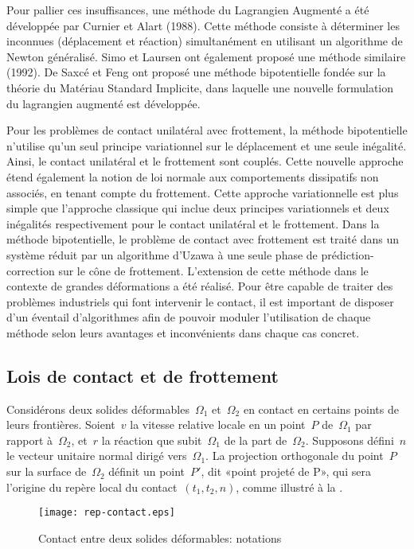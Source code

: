 \medskip
Pour pallier ces insuffisances, une méthode du Lagrangien Augmenté a été développée par Curnier et Alart (1988). Cette méthode consiste à déterminer les inconnues (déplacement et réaction) simultanément en utilisant un algorithme de Newton généralisé. Simo et Laursen ont également proposé une méthode similaire (1992). De Saxcé et Feng ont proposé une méthode bipotentielle fondée sur la théorie du Matériau Standard Implicite, dans laquelle une nouvelle formulation du lagrangien augmenté est développée.

Pour les problèmes de contact unilatéral avec frottement, la méthode bipotentielle n'utilise qu'un seul principe variationnel sur le déplacement et une seule inégalité. Ainsi, le contact unilatéral et le frottement sont couplés. Cette nouvelle approche étend également la notion de loi normale aux comportements dissipatifs non associés, en tenant compte du frottement. Cette approche variationnelle est plus simple que l'approche classique qui inclue deux principes variationnels et deux inégalités respectivement pour le contact unilatéral et le frottement. Dans la méthode bipotentielle, le problème de contact avec frottement est traité dans un système réduit par un algorithme d'Uzawa à une seule phase de prédiction-correction sur le cône de frottement. L'extension de cette méthode dans le contexte de grandes déformations a été réalisé. Pour être capable de traiter des problèmes industriels qui font intervenir le contact, il est important de disposer d'un éventail d'algorithmes afin de pouvoir moduler l'utilisation de chaque méthode selon leurs avantages et inconvénients dans chaque cas concret.

\medskip
\subsection{Lois de contact et de frottement}

Considérons deux solides déformables~$\Omega_1$ et~$\Omega_2$ en contact en certains points de leurs frontières. Soient~$v$ la vitesse relative locale en un point~$P$ de~$\Omega_1$ par rapport à~$\Omega_2$, et~$r$ la réaction que subit~$\Omega_1$ de la part de~$\Omega_2$.
Supposons défini~$n$ le vecteur unitaire normal dirigé vers~$\Omega_1$.
La projection orthogonale du point~$P$ sur la surface de~$\Omega_2$ définit un point~$P'$, dit «point projeté de P», qui sera l'origine du repère local du contact~$(t_1, t_2, n)$,
comme illustré à la .
\begin{figure}[htb]
\centerline{\texttt{[image: rep-contact.eps]}}
\caption{Contact entre deux solides déformables: notations}\label{Fig-rep-contact}
\end{figure}

